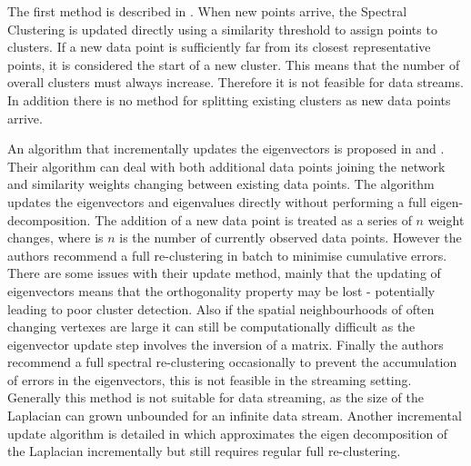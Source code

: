 

The first method is described in \cite{Valgren2008}. When new points arrive, the Spectral Clustering is updated directly using a similarity threshold to assign points to clusters. If a new data point is sufficiently far from its closest representative points, it is considered the start of a new cluster. This means that the number of overall clusters  must always increase. Therefore it is not feasible for data streams. In addition there is no method for splitting existing clusters as new data points arrive. %

An algorithm that incrementally updates the eigenvectors is proposed in \cite{Ning2007} and  \cite{Ning2010}. Their algorithm can deal with both additional data points joining the network and similarity weights changing between existing data points. The algorithm updates the eigenvectors and eigenvalues directly without performing a full eigen-decomposition. The addition of a new data point is treated as a series of $n$ weight changes, where is $n$ is the number of currently observed data points.  However the authors recommend a full re-clustering in batch to minimise cumulative errors. There are some issues with their update method, mainly that the updating of eigenvectors means that the orthogonality property may be lost - potentially leading to poor cluster detection. Also if the spatial neighbourhoods of often changing vertexes are large it can still be computationally difficult as the eigenvector update step involves the inversion of a matrix. Finally the authors recommend a full spectral re-clustering occasionally to prevent the accumulation of errors in the eigenvectors, this is not feasible in the streaming setting. Generally this method is not suitable for data streaming, as the size of the Laplacian can grown unbounded for an infinite data stream. Another incremental update algorithm is detailed in \cite{Dhanjal2014} which approximates the eigen decomposition of the Laplacian incrementally but still requires regular full re-clustering. %

